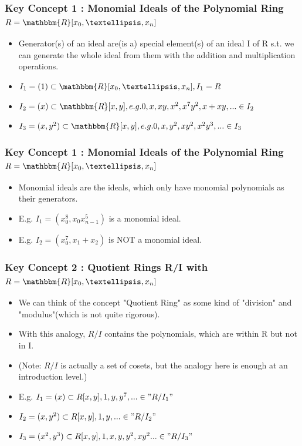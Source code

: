 \documentclass{beamer}
\begin{document}
\begin{frame}
\frametitle{Key Concept 1 : Monomial Ideals of the Polynomial Ring \(R = \mathbbm{R}[x_0, …, x_n]\)}
\begin{itemize}
	\item Generator(s) of an ideal are(is a) special element(s) of an ideal I of R s.t. we can generate the whole ideal from them with the addition and multiplication operations.
	\item \(I_1 = (1) \subset \mathbbm{R}[x_0, …, x_n], I_1 = R\)
	\item \(I_2 = (x) \subset \mathbbm{R}[x, y], e.g. 0, x, xy, x^2, x^7y^2, x + xy, ... \in I_2\)
	\item \(I_3 = (x, y^2) \subset \mathbbm{R}[x, y], e.g. 0, x, y^2, xy^2, x^2y^3,... \in I_3\)
\end{itemize}
\end{frame}

\begin{frame}
\frametitle{Key Concept 1 : Monomial Ideals of the Polynomial Ring \(R = \mathbbm{R}[x_0, …, x_n]\)}
\begin{itemize}
	\item Monomial ideals are the ideals, which only have monomial polynomials as their generators.
	\item E.g. \(I_1 = (x_0^8, x_0x_{n - 1}^5)\) is a monomial ideal.
	\item E.g. \(I_2 = (x_0^7, x_1 + x_2)\) is NOT a monomial ideal.
\end{itemize}
\end{frame}


\begin{frame}
\frametitle{Key Concept 2 : Quotient Rings R/I with \(R = \mathbbm{R}[x_0, …, x_n]\)}
\begin{itemize}
	\item We can think of the concept "Quotient Ring" as some kind of "division" and "modulus"(which is not quite rigorous).
	\item With this analogy, \(R/I\) contains the polynomials, which are within R but not in I.
	\item (Note: \(R/I\) is actually a set of cosets, but the analogy here is enough at an introduction level.)
	\item E.g. \(I_1 = (x) \subset R[x, y], 1, y, y^7, ... \in "R/I_1"\)
	\item \(I_2 = (x, y^2) \subset R[x, y], 1, y, ... \in "R/I_2"\)
	\item \(I_3 = (x^2, y^3) \subset R[x, y], 1, x, y, y^2, xy^2 ... \in "R/I_3"\)
\end{itemize}
\end{frame}
\end{document}
